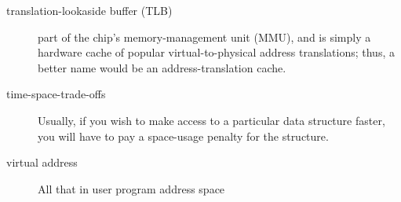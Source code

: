 \begin{description}
\item[translation-lookaside buffer (TLB)] part of the chip’s memory-management unit (MMU), and is simply a hardware cache of popular virtual-to-physical address translations; thus, a better name would be an address-translation cache.

\item[time-space-trade-offs] Usually, if you wish to make access to a particular data structure faster, you will have to pay a space-usage penalty for the structure.

\item[virtual address] All that in user program address space



\end{description}
